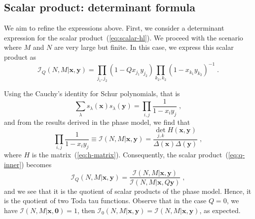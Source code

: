 \documentclass[a4paper,11pt]{amsart}
\begin{document}
\subsection{Scalar product: determinant formula}
We aim to refine the expressions above. First, we consider a
determinant expression for the scalar product~(\ref{eq:scalar-hl}). We
proceed with the scenario where \(M\) and \(N\) are very large but
finite. In this case, we express this scalar product as
\begin{equation}
\label{eq:q-inner}
  \mathcal{I}_Q(N,M | \bm{x}, \bm{y})  
= \prod_{j_1, j_2} (1-Q x_{j_1} y_{j_2}) \prod_{k_2, k_2}(1 - x_{k_1} y_{k_2})^{-1}\; .
\end{equation}

Using the Cauchy's identity for Schur polynomials, that is 
\begin{equation}
  \sum_\lambda s_\lambda(\bm{x}) s_\lambda(\bm{y}) = \prod_{i,j} \frac{1}{1 - x_i y_j}\; ,
\end{equation}
and from the results derived in the phase model, we find that
\begin{equation}
  \prod_{i,j}\frac{1}{1 - x_i y_j}  \equiv \mathcal{I}(N,M|\bm{x}, \bm{y}) = 
  \frac{\det_{j,k}H(\bm{x},\bm{y})}{\Delta(\bm{x}) \Delta(\bm{y})}\; ,
\end{equation}
where \(H\) is the matrix~(\ref{eq:h-matrix}). Consequently, the scalar
product~(\ref{eq:q-inner}) becomes
\begin{equation}
  \mathcal{I}_Q(N,M | \bm{x}, \bm{y})  
= \frac{\mathcal{I}(N,M|\bm{x}, \bm{y})}{\mathcal{I}(N,M|\bm{x}, Q\bm{y})}\; , 
\end{equation}
and we see that it is the quotient of scalar products of the phase
model. Hence, it is the quotient of two Toda tau functions.
Observe that in the case \(Q = 0\), we have \(\mathcal{I}(N, M|
\bm{x}, \bm{0}) = 1\), then \(\mathcal{I}_0(N,M | \bm{x}, \bm{y})
= \mathcal{I}(N,M | \bm{x}, \bm{y})\), as expected.
\end{document}
